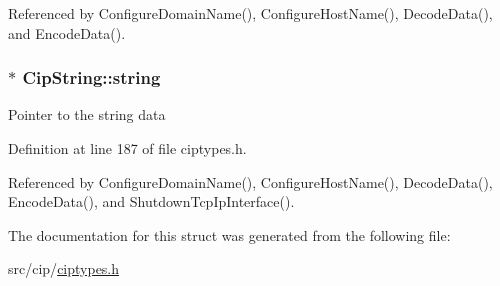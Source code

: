 \-Referenced by \-Configure\-Domain\-Name(), \-Configure\-Host\-Name(), \-Decode\-Data(), and \-Encode\-Data().

\hypertarget{structCipString_a5e952aabbdf886a82f194f9e8a3908b1}{
\subsubsection[{string}]{$\ast$ {\bf \-Cip\-String\-::string}}}\label{df/d66/structCipString_a5e952aabbdf886a82f194f9e8a3908b1}
\-Pointer to the string data 

\-Definition at line 187 of file ciptypes.\-h.



\-Referenced by \-Configure\-Domain\-Name(), \-Configure\-Host\-Name(), \-Decode\-Data(), \-Encode\-Data(), and \-Shutdown\-Tcp\-Ip\-Interface().



\-The documentation for this struct was generated from the following file\-:\begin{DoxyCompactItemize}
\item 
src/cip/\hyperlink{ciptypes_8h}{ciptypes.\-h}\end{DoxyCompactItemize}
